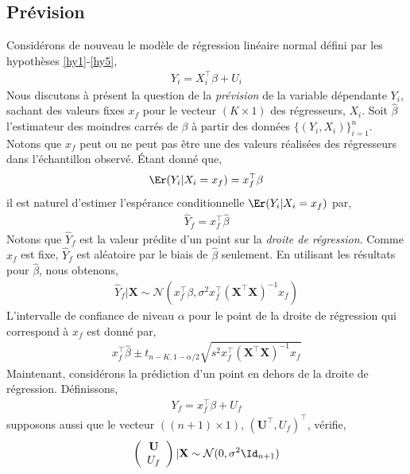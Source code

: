 \subsection{Prévision}
Considérons de nouveau le modèle de régression linéaire normal défini par les hypothèses \ref{hy1}-\ref{hy5},
\begin{align*}
Y_i = X_i^\top\beta+U_i
\end{align*}
Nous discutons à présent la question de la \emph{prévision} de la variable dépendante $Y_i$, sachant des valeurs fixes $x_f$ pour le vecteur $(K\times 1)$ des régresseurs, $X_i$. Soit $\widehat{\beta}$ l'estimateur des moindres carrés de $\beta$ à partir des données $\{(Y_i, X_i)\}_{i=1}^n$. Notons que $x_f$ peut ou ne peut pas être une des valeurs réalisées des régresseurs dans l'échantillon observé. \'Etant donné que,
\begin{align*}
\Er(Y_i| X_i=x_f) = x_f^\top\beta
\end{align*} 
il est naturel d'estimer l'espérance conditionnelle $\Er(Y_i|X_i =x_f)$ par,
\begin{align}
\widehat{Y}_f = x_f^\top\widehat{\beta}
\label{eq54}
\end{align}
Notons que $\widehat{Y}_f$ est la valeur prédite d'un point sur la \emph{droite de régression}. Comme $x_f$ est fixe, $\widehat{Y}_f $ est aléatoire par le biais de $\widehat{\beta}$ seulement. En utilisant les résultats pour $\widehat{\beta}$, nous obtenons,
\begin{align*}
\widehat{Y}_f|\mathbf{X} \sim \mathcal{N}(x_f^\top\beta, \sigma^2x_f^\top(\mathbf{X}^\top\mathbf{X})^{-1}x_f)
\end{align*}
L'intervalle de confiance de niveau $\alpha$ pour le point de la droite de régression qui correspond à $x_f$ est donné par,
\begin{align*}
x_f^\top\widehat{\beta} \pm t_{n-K, 1-\alpha/2}\sqrt{s^2x_f^\top (\mathbf{X}^\top\mathbf{X})^{-1}x_f}
\end{align*}
Maintenant, considérons la prédiction d'un point en dehors de la droite de régression. Définissons,
\begin{align*}
Y_f = x_f^\top\beta + U_f
\end{align*}
supposons aussi que le vecteur $((n+1) \times 1)$, $(\mathbf{U}^\top, U_f)^\top$, vérifie,
\begin{align}
\left(
\begin{array}{c}
\mathbf{U}\\
U_f
\end{array}
\right)|\mathbf{X}
\sim
\mathcal{N}(0, \sigma^2\Id_{n+1})
\label{eq55}
\end{align}
